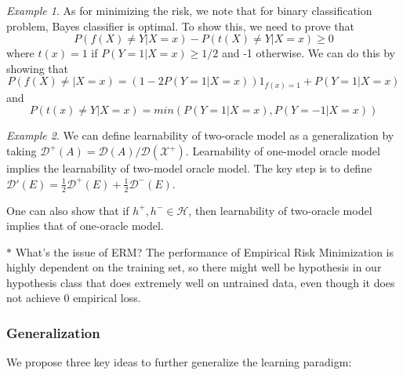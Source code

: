 \documentclass{article}
\theoremstyle{remark}
\newtheorem{example}{Example}
\begin{document}
    \begin{example}
    As for minimizing the risk, we note that for binary classification problem, Bayes classifier is optimal. To show this, we need to prove that $$P(f(X)\neq Y\vert X=x)-P(t(X)\neq Y\vert X=x)\geq 0$$ where $t(x)=1$ if $P(Y=1\vert X=x)\geq 1/2$ and -1 otherwise. We can 
    do this by showing that $$P(f(X)\neq\vert X=x)=(1-2P(Y=1\vert X=x))1_{f(x)=1}+P(Y=1\vert X=x)$$ and $$P(t(x)\neq Y\vert X=x)=min(P(Y=1\vert X=x), P(Y=-1\vert X=x))$$
    \end{example}

    \begin{example}
        We can define learnability of two-oracle model as a generalization by taking $\mathcal{D}^+(A)=\mathcal{D}(A)/\mathcal{D}(\mathcal{X}^+)$. Learnability of one-model oracle model implies the learnability of two-model oracle model. The key step is to define $\mathcal{D}'(E)=\frac 12\mathcal{D}^+(E)+\frac 12\mathcal{D}^-(E)$.

        One can also show that if $h^+,h^-\in \mathcal{H}$, then learnability of two-oracle model implies that of one-oracle model.
        \end{example}

    $\ast$ What's the issue of ERM? The performance of Empirical Risk Minimization is highly dependent on the training set, so there might well be hypothesis in our hypothesis class
     that does extremely well on untrained data, even though it does not achieve 0 empirical loss.

    \subsubsection*{Generalization}

    We propose three key ideas to further generalize the learning paradigm:
\end{document}
